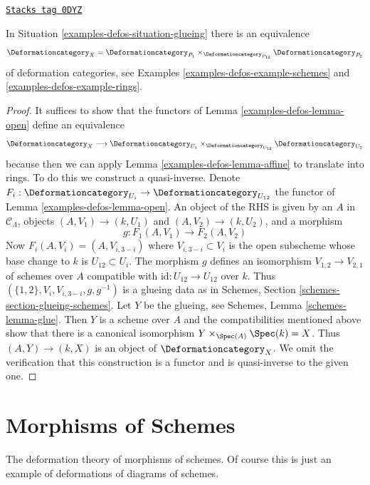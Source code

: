 \begin{lemma}[Glueing]
\label{examples-defos-lemma-glueing}
\href{https://stacks.math.columbia.edu/tag/0DYZ}{\texttt{Stacks tag 0DYZ}}

In Situation \ref{examples-defos-situation-glueing}
there is an equivalence
$$
\Deformationcategory_X =
\Deformationcategory_{P_1}
\times_{\Deformationcategory_{P_{12}}}
\Deformationcategory_{P_2}
$$
of deformation categories, see Examples \ref{examples-defos-example-schemes} and
\ref{examples-defos-example-rings}.
\end{lemma}

\begin{proof}
It suffices to show that the functors of Lemma \ref{examples-defos-lemma-open}
define an equivalence
$$
\Deformationcategory_X \longrightarrow
\Deformationcategory_{U_1}
\times_{\Deformationcategory_{U_{12}}}
\Deformationcategory_{U_2}
$$
because then we can apply Lemma \ref{examples-defos-lemma-affine} to translate into rings.
To do this we construct a quasi-inverse. Denote
$F_i : \Deformationcategory_{U_i} \to \Deformationcategory_{U_{12}}$
the functor of Lemma \ref{examples-defos-lemma-open}.
An object of the RHS is given by an $A$ in $\mathcal{C}_\Lambda$,
objects $(A, V_1) \to (k, U_1)$ and $(A, V_2) \to (k, U_2)$, and
a morphism
$$
g : F_1(A, V_1) \to F_2(A, V_2)
$$
Now $F_i(A, V_i) = (A, V_{i, 3 - i})$ where $V_{i, 3 - i} \subset V_i$
is the open subscheme whose base change to $k$ is $U_{12} \subset U_i$.
The morphism $g$ defines an isomorphism
$V_{1, 2} \to V_{2, 1}$ of schemes over $A$ compatible
with $\text{id} : U_{12} \to U_{12}$ over $k$.
Thus $(\{1, 2\}, V_i, V_{i, 3 - i}, g, g^{-1})$ is a glueing
data as in Schemes, Section \ref{schemes-section-glueing-schemes}.
Let $Y$ be the glueing, see Schemes, Lemma \ref{schemes-lemma-glue}.
Then $Y$ is a scheme over $A$ and the
compatibilities mentioned above show that
there is a canonical isomorphism
$Y \times_{\Spec(A)} \Spec(k) = X$.
Thus $(A, Y) \to (k, X)$ is an object of $\Deformationcategory_X$.
We omit the verification that this construction is a functor
and is quasi-inverse to the given one.
\end{proof}

\section{Morphisms of Schemes}
\label{examples-defos-section-schemes-morphisms}
The deformation theory of morphisms of schemes.
Of course this is just an example of
deformations of diagrams of schemes.

